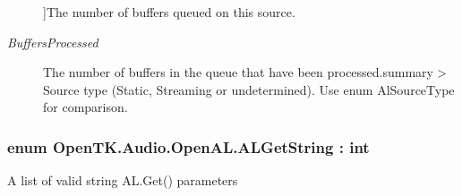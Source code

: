 \begin{Desc}
\begin{description}
{}]The number of buffers queued on this source.\item[{\em 
\hypertarget{namespace_open_t_k_1_1_audio_1_1_open_a_l_af53d9846ac8c67c349af460bade8edbcacb1ae2d18d0e4ebba248a761a1740a0e}{Buffers\-Processed}\label{namespace_open_t_k_1_1_audio_1_1_open_a_l_af53d9846ac8c67c349af460bade8edbcacb1ae2d18d0e4ebba248a761a1740a0e}
}]The number of buffers in the queue that have been processed.summary$>$Source type (Static, Streaming or undetermined). Use enum Al\-Source\-Type for comparison.\end{description}
\end{Desc}
\hypertarget{namespace_open_t_k_1_1_audio_1_1_open_a_l_a91d05be8853c30fa516eb64e21e62256}{
\subsubsection[{A\-L\-Get\-String}]{\setlength{\rightskip}{0pt plus 5cm}enum {\bf Open\-T\-K.\-Audio.\-Open\-A\-L.\-A\-L\-Get\-String} \-: int}}\label{namespace_open_t_k_1_1_audio_1_1_open_a_l_a91d05be8853c30fa516eb64e21e62256}


A list of valid string A\-L.\-Get() parameters


